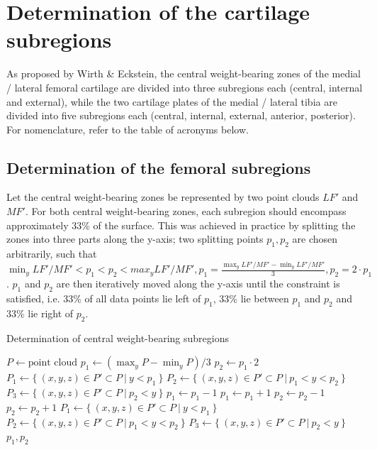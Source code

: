 \section{Determination of the cartilage subregions}
\label{sec:Subregions}
As proposed by Wirth \& Eckstein, the central weight-bearing zones of the medial / lateral femoral cartilage are divided into three subregions each (central, internal and external), while the two cartilage plates of the medial / lateral tibia are divided into five subregions each (central, internal, external, anterior, posterior). For nomenclature, refer to the table of acronyms below. 
\subsection{Determination of the femoral subregions}
Let the central weight-bearing zones be represented by two point clouds $LF'$ and $MF'$. For both central weight-bearing zones, each subregion should encompass approximately 33\% of the surface. This was achieved in practice by splitting the zones into three parts along the y-axis; two splitting points $p_1, p_2$ are chosen arbitrarily, such that $\min_{y} LF'/MF' < p_1 < p_2 < max_{y} LF'/MF', p_1 = \frac{\max_{y} LF'/MF' - \min_{y} LF'/MF'}{3}, p_2 = 2 \cdot p_1$. $p_1$ and $p_2$ are then iteratively moved along the y-axis until the constraint is satisfied, i.e. 33\% of all data points lie left of $p_1$, 33\% lie between $p_1$ and $p_2$ and 33\% lie right of $p_2$.
\begin{algorithm}
	\caption{Determination of central weight-bearing subregions}
	\label{algo:cwbzRegions}
	\begin{algorithmic}[1]
		\State $P \gets \text{point cloud}$
		\State $p_1 \gets (\max_{y} P - \min_{y} P) / 3$
		\State $p_2 \gets p_1 \cdot 2$
		\State $P_1 \gets \{\:(x,y,z) \in P' \subset P \:|\: y < p_1\:\}$
		\State $P_2 \gets \{\:(x,y,z) \in P' \subset P \:|\: p_1 < y < p_2\:\}$
		\State $P_3 \gets \{\:(x,y,z) \in P' \subset P \:|\: p_2 < y\:\}$
		\Repeat
				\State $p_1 \gets p_1 - 1$
			\Else
				\State $p_1 \gets p_1 + 1$
			\EndIf
				\State $p_2 \gets p_2 - 1$
			\Else
				\State $p_2 \gets p_2 + 1$
			\EndIf
			\State $P_1 \gets \{\:(x,y,z) \in P' \subset P \:|\: y < p_1\:\}$
			\State $P_2 \gets \{\:(x,y,z) \in P' \subset P \:|\: p_1 < y < p_2\:\}$
			\State $P_3 \gets \{\:(x,y,z) \in P' \subset P \:|\: p_2 < y\:\}$
		\State
		\Return $p_1, p_2$
		\EndProcedure
	\end{algorithmic}
\end{algorithm}
